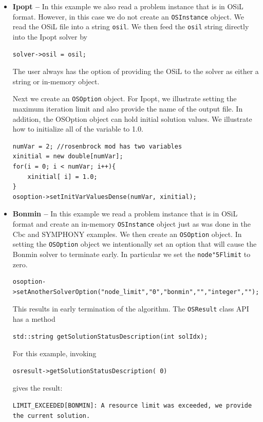 \documentclass[11pt]{article}
\renewcommand{\_}{{\char"5F}}
\renewcommand{\{}{{\char"7B}}
\renewcommand{\}}{{\char"7D}}
\renewcommand{\^}{{\char"0D}}
\renewcommand{\'}{{\char"0D}}
\begin{document}
\begin{enumerate}[Step 1:]
\begin{itemize}
\item {\bf Ipopt --}   In this example we also read a problem instance that is in OSiL format.  
However, in this case we do  not create an {\tt OSInstance} object. We read the OSiL file into 
a string {\tt osil}.  We then feed the {\tt osil} string directly into the Ipopt solver by
\begin{verbatim}
solver->osil = osil;
\end{verbatim} 
The user always has the option of providing the OSiL to the solver as either a string or in-memory object.

Next we create an {\tt OSOption} object. For Ipopt, we illustrate setting the maximum iteration limit 
and also provide the name of the output file. In addition, the OSOption object can hold initial solution 
values. We illustrate how to initialize all of the variable to 1.0.

\begin{verbatim}
numVar = 2; //rosenbrock mod has two variables 
xinitial = new double[numVar];
for(i = 0; i < numVar; i++){
    xinitial[ i] = 1.0;
}
osoption->setInitVarValuesDense(numVar, xinitial);
\end{verbatim}



\item {\bf Bonmin --}  In this example we read a problem instance that is in OSiL format and create 
an in-memory {\tt OSInstance} object just as was done in the Cbc and SYMPHONY examples.   
We then create an {\tt OSOption} object.  In setting the  {\tt OSOption} object we intentionally 
set an option that will cause the Bonmin solver to terminate early.  In particular we set the 
{\tt node\_limit} to zero. 

\begin{verbatim}
osoption->setAnotherSolverOption("node_limit","0","bonmin","","integer","");
\end{verbatim}

This results in early termination of the algorithm. The {\tt OSResult} class API has a method
\begin{verbatim}
std::string getSolutionStatusDescription(int solIdx);
\end{verbatim}

For this example, invoking
\begin{verbatim}
osresult->getSolutionStatusDescription( 0)
\end{verbatim}
gives the result:
\begin{verbatim}
LIMIT_EXCEEDED[BONMIN]: A resource limit was exceeded, we provide the current solution.
\end{verbatim}



\end{itemize}
\end{enumerate}
\end{document}
